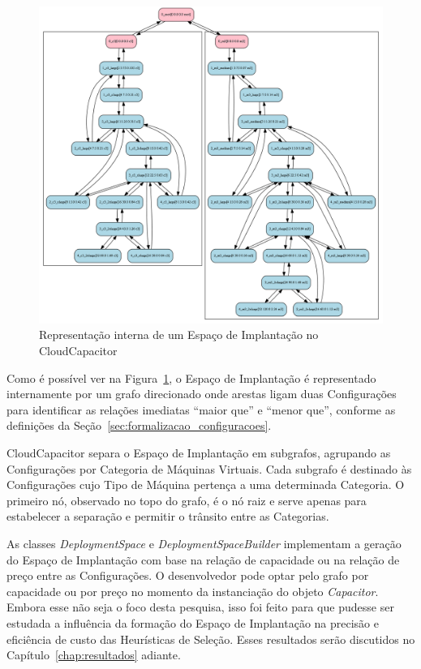\begin{figure}[htb]
  \caption{\label{fig:depspace_real}Representação interna de um Espaço de Implantação no CloudCapacitor}
  \begin{center}
    \includegraphics[scale=0.35]{img/exemplo_grafo_espaco_implantacao}
  \end{center}
\end{figure}

Como é possível ver na Figura~\ref{fig:depspace_real}, o Espaço de Implantação é 
representado internamente por um grafo direcionado onde arestas ligam duas 
Configurações para identificar as relações imediatas ``maior que'' e ``menor que'', 
conforme as definições da Seção~\ref{sec:formalizacao_configuracoes}. 

CloudCapacitor separa o Espaço de Implantação em subgrafos, agrupando as
Configurações por Categoria de Máquinas Virtuais. Cada subgrafo é destinado às
Configurações cujo Tipo de Máquina pertença a uma determinada Categoria. O primeiro
nó, observado no topo do grafo, é o nó raiz e serve apenas para estabelecer a 
separação e permitir o trânsito entre as Categorias.

As classes \emph{DeploymentSpace} e \emph{DeploymentSpaceBuilder} implementam
a geração do Espaço de Implantação com base na relação de capacidade ou na relação
de preço entre as Configurações. O desenvolvedor pode optar pelo grafo por capacidade ou por preço no momento da
instanciação do objeto \emph{Capacitor}. Embora esse não seja o foco desta 
pesquisa, isso foi feito para que pudesse ser estudada a influência da formação 
do Espaço de Implantação na precisão e eficiência de custo das Heurísticas de 
Seleção. Esses resultados serão discutidos no Capítulo~\ref{chap:resultados} 
adiante.

